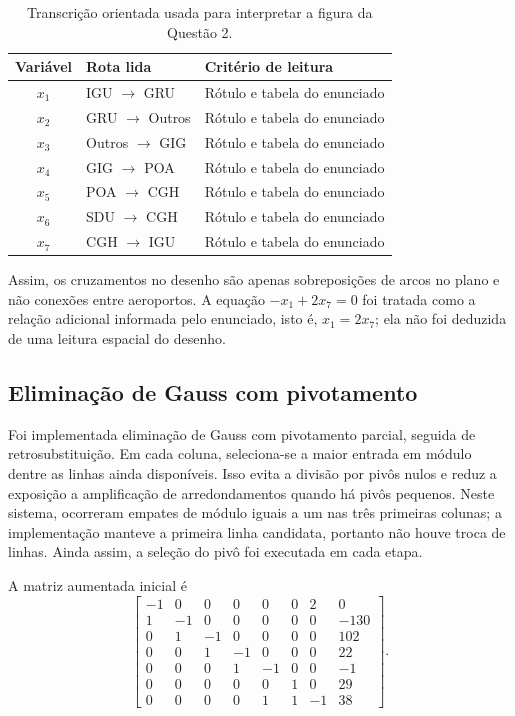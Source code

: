 \documentclass[11pt,a4paper]{article}
\begin{document}
\begin{table}[H]
\centering
\caption{Transcrição orientada usada para interpretar a figura da Questão 2.}
\label{tab:leitura-grafo}
\begin{tabular}{cll}
\toprule
Variável & Rota lida & Critério de leitura \\
\midrule
$x_1$ & IGU $\rightarrow$ GRU & Rótulo e tabela do enunciado \\
$x_2$ & GRU $\rightarrow$ Outros & Rótulo e tabela do enunciado \\
$x_3$ & Outros $\rightarrow$ GIG & Rótulo e tabela do enunciado \\
$x_4$ & GIG $\rightarrow$ POA & Rótulo e tabela do enunciado \\
$x_5$ & POA $\rightarrow$ CGH & Rótulo e tabela do enunciado \\
$x_6$ & SDU $\rightarrow$ CGH & Rótulo e tabela do enunciado \\
$x_7$ & CGH $\rightarrow$ IGU & Rótulo e tabela do enunciado \\
\bottomrule
\end{tabular}
\end{table}

Assim, os cruzamentos no desenho são apenas sobreposições de arcos no plano e não conexões entre aeroportos. A equação $-x_1+2x_7=0$ foi tratada como a relação adicional informada pelo enunciado, isto é, $x_1=2x_7$; ela não foi deduzida de uma leitura espacial do desenho.

\subsection{Eliminação de Gauss com pivotamento}

Foi implementada eliminação de Gauss com pivotamento parcial, seguida de retrosubstituição. Em cada coluna, seleciona-se a maior entrada em módulo dentre as linhas ainda disponíveis. Isso evita a divisão por pivôs nulos e reduz a exposição a amplificação de arredondamentos quando há pivôs pequenos. Neste sistema, ocorreram empates de módulo iguais a um nas três primeiras colunas; a implementação manteve a primeira linha candidata, portanto não houve troca de linhas. Ainda assim, a seleção do pivô foi executada em cada etapa.

A matriz aumentada inicial é
\[
\left[\begin{array}{rrrrrrr|r}
-1&0&0&0&0&0&2&0\\1&-1&0&0&0&0&0&-130\\0&1&-1&0&0&0&0&102\\0&0&1&-1&0&0&0&22\\0&0&0&1&-1&0&0&-1\\0&0&0&0&0&1&0&29\\0&0&0&0&1&1&-1&38
\end{array}\right].
\]
\end{document}
